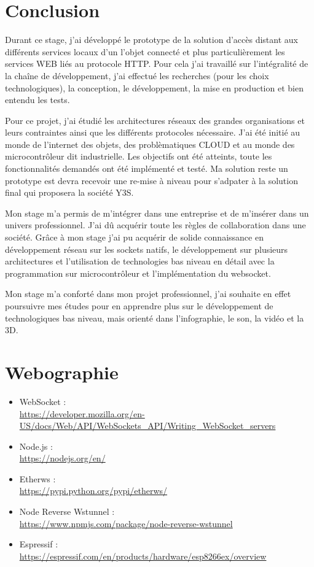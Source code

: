 \chapter*{Conclusion}
\label{sec:conclusion}

Durant ce stage, j’ai développé le prototype de la solution d'accès distant aux différents services locaux d’un l’objet connecté et plus particulièrement les services WEB liés au protocole HTTP. Pour cela j'ai travaillé sur l'intégralité de la chaîne de développement, j'ai effectué les recherches (pour les choix technologiques), la conception, le développement, la mise en production et bien entendu les tests.

Pour ce projet, j'ai étudié les architectures réseaux des grandes organisations et leurs contraintes ainsi que les différents protocoles nécessaire. J'ai été initié au monde de l'internet des objets, des problèmatiques CLOUD et au monde des microcontrôleur dit industrielle. Les objectifs ont été atteints, toute les fonctionnalités demandés ont été implémenté et testé. Ma solution reste un prototype est devra recevoir une re-mise à niveau pour s'adpater à la solution final qui proposera la société Y3S.

Mon stage m'a permis de m'intégrer dans une entreprise et de m'insérer dans un univers professionnel. J'ai dû acquérir toute les règles de collaboration dans une société. Grâce à mon stage j'ai pu acquérir de solide connaissance en développement réseau sur les sockets natifs, le développement sur plusieurs architectures et l'utilisation de technologies bas niveau en détail avec la programmation sur microcontrôleur et l'implémentation du websocket.

Mon stage m'a conforté dans mon projet professionnel, j'ai souhaite en effet poursuivre mes études pour en apprendre plus sur le développement de technologiques bas niveau, mais orienté dans l'infographie, le son, la vidéo et la 3D.

\chapter*{Webographie}


\begin{itemize}
\item WebSocket : \\\url{https://developer.mozilla.org/en-US/docs/Web/API/WebSockets_API}\goodbreak\url{/Writing_WebSocket_servers}
\item Node.js : \\\url{https://nodejs.org/en/}
\item Etherws : \\\url{https://pypi.python.org/pypi/etherws/}
\item Node Reverse Wstunnel : \\\url{https://www.npmjs.com/package/node-reverse-wstunnel}
\item Espressif : \\\url{https://espressif.com/en/products/hardware/esp8266ex/overview}
\end{itemize}


